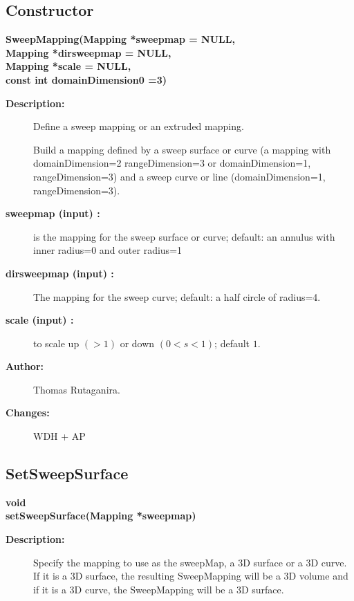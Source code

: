 \subsection{Constructor}
 
\newlength{\SweepMappingIncludeArgIndent}
\begin{flushleft} \textbf{%
\settowidth{\SweepMappingIncludeArgIndent}{SweepMapping(}%
SweepMapping(Mapping *sweepmap  = NULL,\\ 
\hspace{\SweepMappingIncludeArgIndent}Mapping *dirsweepmap  = NULL,\\ 
\hspace{\SweepMappingIncludeArgIndent}Mapping *scale  = NULL,\\ 
\hspace{\SweepMappingIncludeArgIndent}const int domainDimension0  =3)
}\end{flushleft}
\begin{description}
\item[{\bf Description:}]  Define a sweep mapping or an extruded mapping.

 Build a mapping defined by a sweep surface or curve
 (a mapping with domainDimension=2 rangeDimension=3 or 
 domainDimension=1, rangeDimension=3) and a sweep
 curve or line (domainDimension=1, rangeDimension=3).

\item[{\bf sweepmap (input) :}]  is the mapping for the sweep surface or curve; default: an
            annulus with inner radius=0 and outer radius=1
\item[{\bf dirsweepmap (input) :}]  The mapping for the sweep curve; default: a half circle
              of radius=4.
\item[{\bf scale (input) :}]  to scale up $(>1)$ or down $(0<s<1)$; default $1$.
 
\item[{\bf Author:}]  Thomas Rutaganira. 
\item[{\bf Changes:}]  WDH + AP
\end{description}
\subsection{SetSweepSurface}
 
\begin{flushleft} \textbf{%
void  \\ 
\settowidth{\SweepMappingIncludeArgIndent}{setSweepSurface(}%
setSweepSurface(Mapping *sweepmap)
}\end{flushleft}
\begin{description}
\item[{\bf Description:}]  Specify the mapping to use as the sweepMap,
               a 3D surface or a 3D curve. If it is a 3D
               surface, the resulting SweepMapping will be a
               3D volume and if it is a 3D curve, the SweepMapping
               will be a 3D surface.
\end{description}
